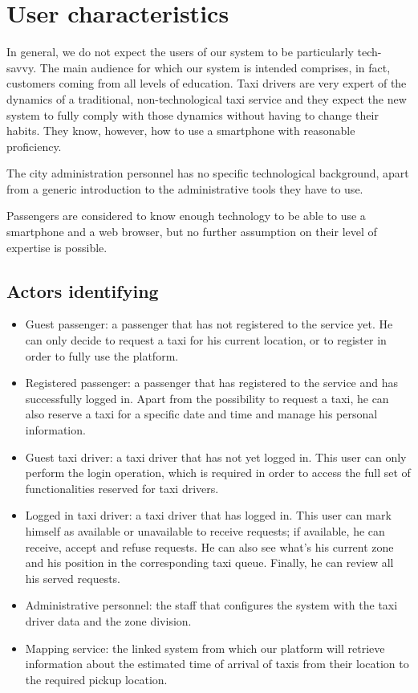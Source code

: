 \section{User characteristics}
In general, we do not expect the users of our system to be particularly tech-savvy. 
The main audience for which our system is intended comprises, in fact, customers coming from all levels of education.
Taxi drivers are very expert of the dynamics of a traditional, non-technological taxi service and they expect the new system to fully comply with those dynamics without having to change their habits. They know, however, how to use a smartphone with reasonable proficiency.

The city administration personnel has no specific technological background, apart from a generic introduction to the administrative tools they have to use.

Passengers are considered to know enough technology to be able to use a smartphone and a web browser, but no further assumption on their level of expertise is possible. 

\subsection{Actors identifying}
\begin{itemize}
\item Guest passenger: a passenger that has not registered to the service yet. He can only decide to request a taxi for his current location, or to register in order to fully use the platform. 
\item Registered passenger: a passenger that has registered to the service and has successfully logged in. Apart from the possibility to request a taxi, he can also reserve a taxi for a specific date and time and manage his personal information.
\item Guest taxi driver: a taxi driver that has not yet logged in. This user can only perform the login operation, which is required in order to access the full set of functionalities reserved for taxi drivers. 
\item Logged in taxi driver: a taxi driver that has logged in. This user can mark himself as available or unavailable to receive requests; if available, he can receive, accept and refuse requests. He can also see what’s his current zone and his position in the corresponding taxi queue. Finally, he can review all his served requests.
\item Administrative personnel: the staff that configures the system with the taxi driver data and the zone division. 
\item Mapping service: the linked system from which our platform will retrieve information about the estimated time of arrival of taxis from their location to the required pickup location.
\end{itemize}

